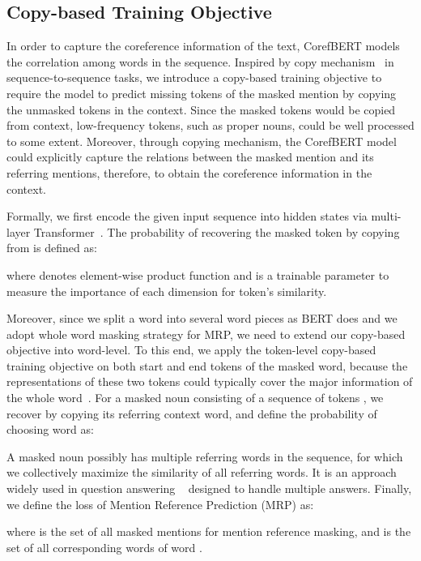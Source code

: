 \documentclass[11pt,a4paper]{article}
\newcommand\CorefBERT{CorefBERT\xspace}
\begin{document}
\subsection{Copy-based Training Objective}

In order to capture the coreference information of the text, CorefBERT models the correlation among words in the sequence. Inspired by copy mechanism~\citep{copynet,copynetMT} in sequence-to-sequence tasks, we introduce a copy-based training objective to require the model to predict missing tokens of the masked mention by copying the unmasked tokens in the context. Since the masked tokens would be copied from context, low-frequency tokens, such as proper nouns, could be well processed to some extent.
Moreover, through copying mechanism, the \CorefBERT model could explicitly capture the relations between the masked mention and its referring mentions, therefore, to obtain the coreference information in the context.



Formally, we first encode the given input sequence  into hidden states  via multi-layer Transformer~\citep{Transformer}. The probability of recovering the masked token  by copying from  is defined as:

where  denotes element-wise product function and  is a trainable parameter to measure the importance of each dimension for token's similarity. 



Moreover, since we split a word into several word pieces as BERT does and we adopt whole word masking strategy for MRP, we need to extend our copy-based objective into word-level. To this end, we apply the token-level copy-based training objective on both start and end tokens of the masked word, because the representations of these two tokens could typically cover the major information of the whole word~\citep{e2ecoref2,neuralsemanticrolelabeling}. For a masked noun  consisting of a sequence of tokens , we recover  by copying its referring context word, and define the probability of choosing word  as:


A masked noun possibly has multiple referring words in the sequence, for which we collectively maximize the similarity of all referring words. It is an approach widely used in question answering ~\citep{ASReader, NeuralCascades, sharednorm} designed to handle multiple answers. Finally, we define the loss of Mention Reference Prediction (MRP) as:

where  is the set of all masked mentions for mention reference masking, and   is the set of all corresponding words of word  .
\end{document}
